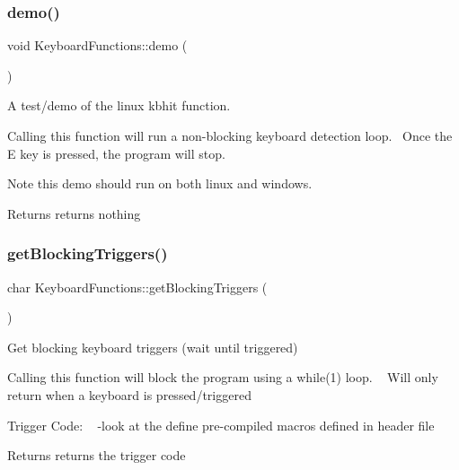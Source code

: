 \subsubsection{\texorpdfstring{demo()}{demo()}}
{\footnotesize\ttfamily void Keyboard\+Functions\+::demo (\begin{DoxyParamCaption}{ }\end{DoxyParamCaption})}



A test/demo of the linux kbhit function. 

Calling this function will run a non-\/blocking keyboard detection loop.~\newline
Once the \textquotesingle{}E\textquotesingle{} key is pressed, the program will stop.

\begin{DoxyNote}{Note}
this demo should run on both linux and windows.
\end{DoxyNote}
\begin{DoxyReturn}{Returns}
returns nothing 
\end{DoxyReturn}
\mbox{\label{class_keyboard_functions_a3c4c4c3032f1dfaafb5d844920f95994}} 
\subsubsection{\texorpdfstring{getBlockingTriggers()}{getBlockingTriggers()}}
{\footnotesize\ttfamily char Keyboard\+Functions\+::get\+Blocking\+Triggers (\begin{DoxyParamCaption}{ }\end{DoxyParamCaption})}



Get blocking keyboard triggers (wait until triggered) 

Calling this function will block the program using a while(1) loop. ~\newline
Will only return when a keyboard is pressed/triggered

Trigger Code\+: ~\newline
-\/look at the define pre-\/compiled macros defined in header file

\begin{DoxyReturn}{Returns}
returns the trigger code 
\end{DoxyReturn}
\mbox{\label{class_keyboard_functions_a7dc688d2e10e9fbbf8bb2ad5e0e163d9}} 
